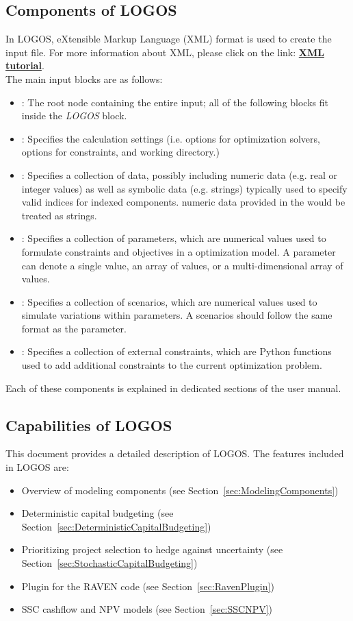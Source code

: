 \subsection{Components of LOGOS}
In LOGOS, eXtensible Markup Language (XML) format is used to create the input file. For more
information about XML, please click on the link:
\href{https://www.w3schools.com/xml/default.asp}{\textbf{XML tutorial}}.
%
\\The main input blocks are as follows:
\begin{itemize}
  \item {}: The root node containing the
  entire input; all of
  the following blocks fit inside the \emph{LOGOS} block.
  \item {}: Specifies the calculation settings (i.e. options for
	optimization solvers, options for constraints, and working directory.)
  \item {}: Specifies a collection of data, possibly including
	numeric data (e.g. real or integer values) as well as symbolic data (e.g. strings)
	typically used to specify valid indices for indexed components.
	\nb numeric data provided in the  would be treated as strings.
	\item {}: Specifies a collection of parameters, which are
  numerical values used to formulate constraints and objectives in a
	optimization model. A parameter can denote a single value, an array of values, or a multi-dimensional
	array of values.
	\item {}: Specifies a collection of scenarios, which are
	numerical values used to simulate variations within parameters. A scenarios should follow
	the same format as the parameter.
	\item {}: Specifies a collection of external constraints, which are
  Python functions used to add additional constraints to the
	current optimization problem.
\end{itemize}

Each of these components is explained in dedicated sections of the user manual.

\subsection{Capabilities of LOGOS}
This document provides a detailed description of LOGOS. The features included in LOGOS are:
\begin{itemize}
  \item Overview of modeling components (see Section~\ref{sec:ModelingComponents})
	\item Deterministic capital budgeting (see Section~\ref{sec:DeterministicCapitalBudgeting})
	\item Prioritizing project selection to hedge against uncertainty (see Section~\ref{sec:StochasticCapitalBudgeting})
	\item Plugin for the RAVEN code (see Section~\ref{sec:RavenPlugin})
	\item SSC cashflow and NPV models (see Section~\ref{sec:SSCNPV})
\end{itemize}
